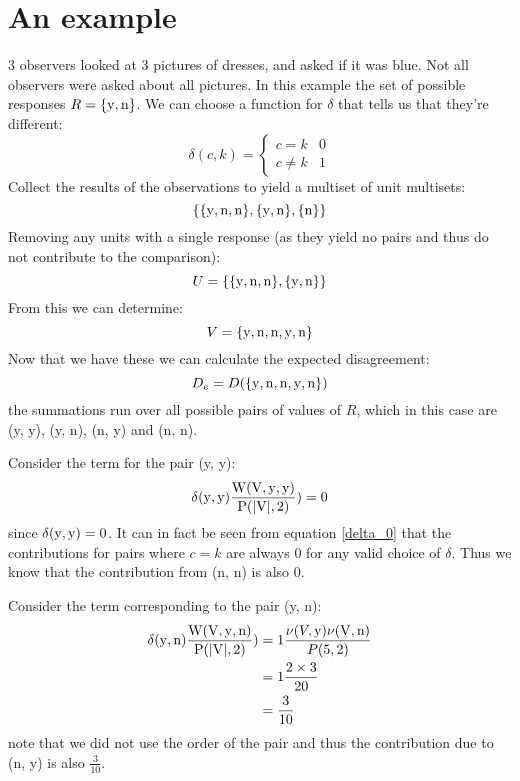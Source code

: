 \documentclass{article}
\begin{document}
\section*{An example}
3 observers looked at 3 pictures of dresses, and asked if it was blue.
Not all observers were asked about all pictures.
In this example the set of possible responses $R = \{\rm{y}, \rm{n}\}$.
We can choose a function for $\delta$ that tells us that they're different:
\begin{equation}
\delta(c, k) = \begin{cases} c = k & 0 \\ c \ne k & 1 \end{cases}
\end{equation}
Collect the results of the observations to yield a multiset of unit multisets:
\begin{equation}
\{ \{\rm{y}, \rm{n}, \rm{n}\}, \{\rm{y}, \rm{n}\}, \{\rm{n}\} \}
\end{equation}
Removing any units with a single response (as they yield no pairs and thus do
not contribute to the comparison):
\begin{equation}
U = \{ \{\rm{y}, \rm{n}, \rm{n}\}, \{\rm{y}, \rm{n}\} \}
\end{equation}
From this we can determine:
\begin{equation}
V = \{ \rm{y}, \rm{n}, \rm{n}, \rm{y}, \rm{n}\}
\end{equation}
Now that we have these we can calculate the expected disagreement:
\begin{equation}
D_e = D(\{ \rm{y}, \rm{n}, \rm{n}, \rm{y}, \rm{n} \}) \\
\end{equation}
the summations run over all possible pairs of values of $R$, which in this case
are (y, y), (y, n), (n, y) and (n, n).

Consider the term for the pair (y, y):
\newcommand{\dforpair}[2]{\delta(\rm{#1}, \rm{#2}) \frac{W(V, \rm{#1}, \rm{#2})}{P(|V|, 2)})}
\begin{equation}
\dforpair{y}{y} = 0
\end{equation}
since $\delta(\rm{y}, \rm{y}) = 0$. It can in fact be seen from equation
\ref{delta_0} that the contributions for pairs where $c = k$ are always 0 for
any valid choice of $\delta$. Thus we know that the contribution from (n, n) is
also 0.

Consider the term corresponding to the pair (y, n):
\begin{align}
\dforpair{y}{n} &= 1\frac{\nu(V, \rm{y}) \nu(V, \rm{n})}{P(5, 2)} \nonumber \\
&= 1\frac{2 \times 3}{20} \nonumber \\
&= \frac{3}{10}
\end{align}
note that we did not use the order of the pair and thus the contribution due to
(n, y) is also $\frac{3}{10}$.
\end{document}
